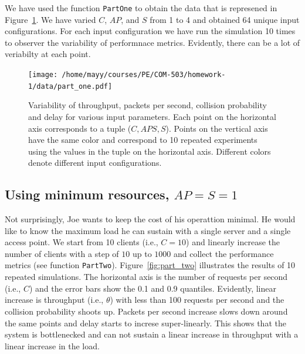 \documentclass{report}
\begin{document}
We have used the function \texttt{PartOne} to obtain the data that is
represened in Figure~\ref{fig:part_one}. We have varied $C$, $AP$, and $S$
from 1 to 4 and obtained 64 unique input configurations. For each input 
configuration we have run the simulation 10 times to observer the variability 
of performnace metrics. Evidently, there can be a lot of veriabilty at each 
point.
\begin{figure}[h]
    \texttt{[image: /home/mayy/courses/PE/COM-503/homework-1/data/part\_one.pdf]}
    \label{fig:part_one}
    \caption{Variability of throughput, packets per second, collision 
    probability and delay for various input parameters. Each point on the 
    horizontal axis corresponds to a tuple ($C, APS, S$). Points on the 
    vertical axis have the same color and correspond to 10 repeated experiments
    using the values in the tuple on the horizontal axis. Different colors 
    denote different input configurations.}
\end{figure}


\subsection{Using minimum resources, $AP=S=1$}

Not surprisingly, Joe wants to keep the cost of his operattion minimal.
He would like to know the maximum load he can sustain with a single server
and a single access point. We start from 10 clients (i.e., $C=10$) and 
linearly increase the number of clients with a step of $10$ up to $1000$ and
collect the performance metrics (see function \texttt{PartTwo}). 
Figure~\ref{fig:part_two} illustrates the results of 10 repeated simulations. 
The horizontal axis is the number of requests per second (i.e., $C$) and
the error bars show the 0.1 and 0.9 quantiles.
Evidently, linear increase is throughput (i.e., $\theta$) with less than
100 requests per second and the collision probability shoots up. Packets per 
second increase slows down around the same points and delay starts to increse
super-linearly. This shows that the system is bottlenecked and can not 
sustain a linear increase in throughput with a linear increase in the load.
\end{document}
